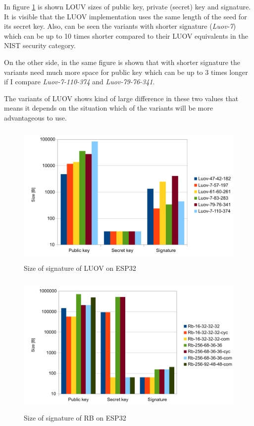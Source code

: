 \documentclass[thesis=M,english]{FITthesis}[2019/12/23]
\begin{document}
\bigskip
\noindent
In figure \ref{sign-luov} is shown LOUV sizes of public key, private (secret) key and signature. It is visible that the LUOV implementation uses the same length of the seed for its secret key. Also, can be seen the variants with shorter signature (\textit{Luov-7}) which can be up to 10 times shorter compared to their LUOV equivalents in the NIST security category.

\bigskip
\noindent
On the other side, in the same figure is shown that with shorter signature the variants need much more space for public key which can be up to 3 times longer if I compare \textit{Luov-7-110-374} and \textit{Luov-79-76-341}.

\bigskip
\noindent
The variants of LUOV shows kind of large difference in these two values that means it depends on the situation which of the variants will be more advantageous to use.  

\begin{figure}[H]
\centering
\includegraphics[width=13cm,height=7cm]{images/sign-luov.pdf}
\caption{Size of signature of LUOV on ESP32}
\label{sign-luov}
\end{figure}

\begin{figure}[H]
\centering
\includegraphics[width=13cm,height=7cm]{images/sign-rb.pdf}
\caption{Size of signature of RB on ESP32}
\label{sign-rb}
\end{figure}
\end{document}
